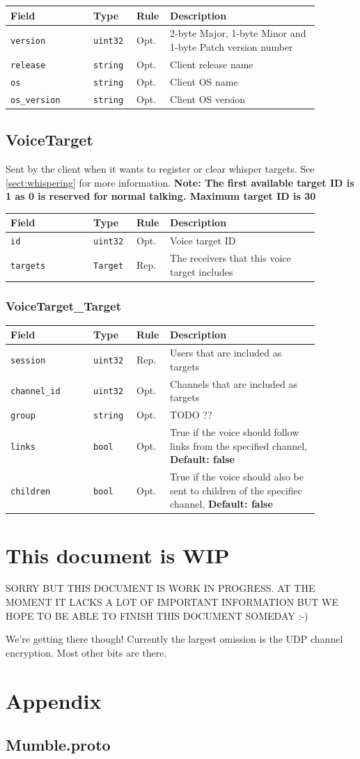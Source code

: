 \documentclass[11pt]{article} %
\newenvironment{mumbleMessageEx}
{%
	\small
	\renewcommand\arraystretch{1.5}
	\begin{tabular}{p{0.25\linewidth}p{0.13\linewidth}p{0.05\linewidth}p{0.45\linewidth}}
	Field & Type & Rule & Description \\
	\hline
}
{%
	\end{tabular}
	\renewcommand\arraystretch{1.0}
}
\newcommand{\mumbleMessageExItem}[4]{ \texttt{#1} & \texttt{#2} & #3 & #4 \\ }
\begin{document}
\begin{mumbleMessageEx}
\mumbleMessageExItem{version}{uint32}{Opt.}{2-byte Major, 1-byte Minor and 1-byte Patch version number}
\mumbleMessageExItem{release}{string}{Opt.}{Client release name}
\mumbleMessageExItem{os}{string}{Opt.}{Client OS name}
\mumbleMessageExItem{os\_version}{string}{Opt.}{Client OS version}
\end{mumbleMessageEx}

\subsection{VoiceTarget}
\label{msg:voiceTarget}

Sent by the client when it wants to register or clear whisper targets. See \ref{sect:whispering} for more information. \textbf{Note: The first available target ID is 1 as 0 is reserved for normal talking. Maximum target ID is 30}

\begin{mumbleMessageEx}
\mumbleMessageExItem{id}{uint32}{Opt.}{Voice target ID}
\mumbleMessageExItem{targets}{Target}{Rep.}{The receivers that this voice target includes}
\end{mumbleMessageEx}

\subsubsection{VoiceTarget\_Target}
\label{msg:voiceTarget:target}

\begin{mumbleMessageEx}
\mumbleMessageExItem{session}{uint32}{Rep.}{Users that are included as targets}
\mumbleMessageExItem{channel\_id}{uint32}{Opt.}{Channels that are included as targets}
\mumbleMessageExItem{group}{string}{Opt.}{TODO ??}
\mumbleMessageExItem{links}{bool}{Opt.}{True if the voice should follow links from the specified channel, \textbf{Default: false}}
\mumbleMessageExItem{children}{bool}{Opt.}{True if the voice should also be sent to children of the specifiec channel, \textbf{Default: false}}
\end{mumbleMessageEx}




\section*{This document is WIP}
SORRY BUT THIS DOCUMENT IS WORK IN PROGRESS. AT THE MOMENT IT LACKS A LOT OF IMPORTANT INFORMATION BUT WE HOPE TO BE ABLE TO FINISH THIS DOCUMENT SOMEDAY :-)

We're getting there though! Currently the largest omission is the UDP channel encryption. Most other bits are there.

\appendix
\section{Appendix}
\subsection{Mumble.proto}
\label{appendix:mumble_proto}
\end{document}
